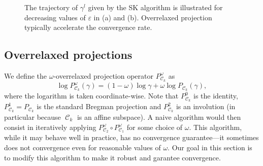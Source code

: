 \documentclass{article} %
\DeclareMathOperator{\Ccal}{\mathcal{C}}
\renewcommand{\epsilon}{\varepsilon}
\theoremstyle{plain}
\theoremstyle{definition}
\theoremstyle{remark}
\begin{document}
\begin{figure}[ht!]
\centering
\begin{minipage}[b]{.33\linewidth}
   \centering
   
                    \subcaption{}\label{fig:schema_a}
\end{minipage}%
\begin{minipage}[b]{.33\linewidth}
   \centering
   
                    \subcaption{}\label{fig:schema_b}
\end{minipage}%
\begin{minipage}[b]{.33\linewidth}
   \centering
   
                    \subcaption{}\label{fig:schema_c}
\end{minipage}%
\caption{\label{alternate_projections} The trajectory of $\gamma^l$ given by the SK algorithm is illustrated for decreasing values of $\epsilon$ in (a) and (b). Overrelaxed projection typically accelerate the convergence rate.}
\end{figure}

\subsection{Overrelaxed projections}

We define the $\omega$-overrelaxed projection operator $P^\omega_{\Ccal_k}$ as
\begin{equation}\label{eq:def_or_proj}
\log P^\omega_{\Ccal_k}(\gamma) = (1-\omega) \log \gamma + \omega \log P_{\Ccal_k}(\gamma),
\end{equation}
where the logarithm is taken coordinate-wise. Note that $P_{\Ccal_k}^0$ is the identity, $P_{\Ccal_k}^1 = P_{\Ccal_k}$ is the standard Bregman projection and $P_{\Ccal_k}^2$ is an involution (in particular because $\Ccal_k$ is an affine subspace). A naive algorithm would then consist in iteratively applying $P^\omega_{\Ccal_2}\circ P^\omega_{\Ccal_1}$ for some choice of $\omega$. This algorithm, while it may behave well in practice, has no convergence guarantee---it sometimes does not convergence even for reasonable values of $\omega$. Our goal in this section is to modify this algorithm to make it robust and garantee convergence.
\end{document}
